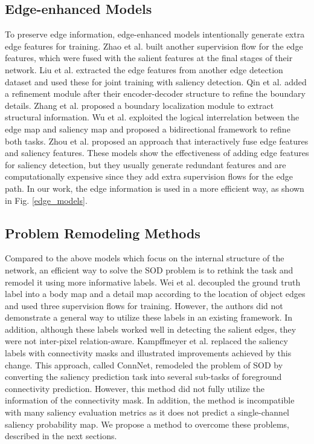 \documentclass[final]{cvpr}
\begin{document}
\subsection{Edge-enhanced Models}
To preserve edge information, edge-enhanced models intentionally generate extra edge features for training. Zhao et al. \cite{egnet} built another supervision flow for the edge features, which were fused with the salient features at the final stages of their network. Liu et al. \cite{poolnet} extracted the edge features from another edge detection dataset and used these for joint training with saliency detection. Qin et al. \cite{basnet} added a refinement module after their encoder-decoder structure to refine the boundary details. Zhang et al. \cite{bound_PR} proposed a boundary localization module to extract structural information.
Wu et al. \cite{scrn} exploited the logical interrelation between the edge map and saliency map and proposed a bidirectional framework to refine both tasks. 
Zhou et al. \cite{ITSD} proposed an approach that interactively fuse edge features and saliency features. These models show the effectiveness of adding edge features for saliency detection, but they usually generate redundant features and are computationally expensive since they add extra supervision flows for the edge path. In our work, the edge information is used in a more efficient way, as shown in Fig. \ref{edge_models}.

\subsection{Problem Remodeling Methods}
Compared to the above models which focus on the internal structure of the network, an efficient way to solve the SOD problem is to rethink the task and remodel it using more informative labels. Wei et al. \cite{LDF} decoupled the ground truth label into a body map and a detail map according to the location of object edges and used three supervision flows for training. However, the authors did not demonstrate a general way to utilize these labels in an existing framework. In addition, although these labels worked well in detecting the salient edges, they were not inter-pixel relation-aware. Kampffmeyer et al. \cite{ConnNet} replaced the saliency labels with connectivity masks and illustrated improvements achieved by this change. This approach, called ConnNet, remodeled the problem of SOD by converting the saliency prediction task into several sub-tasks of foreground connectivity prediction. However, this method did not fully utilize the information of the connectivity mask. In addition, the method is incompatible with many saliency evaluation metrics as it does not predict a single-channel saliency probability map. We propose a method to overcome these problems, described in the next sections.
\end{document}
